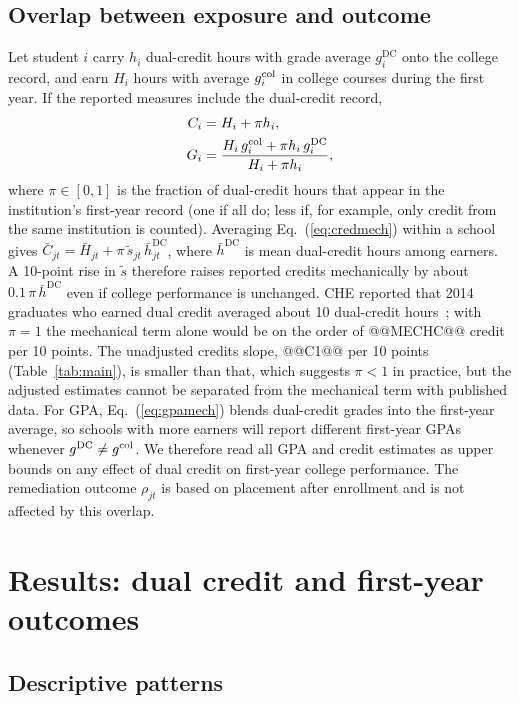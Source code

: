 \documentclass[aps,prd,reprint,superscriptaddress,nofootinbib,floatfix]{revtex4-2}
\newcommand{\DC}{\mathrm{DC}}
\begin{document}
\subsection{Overlap between exposure and outcome}\label{sec:overlap}

Let student $i$ carry $h_i$ dual-credit hours with grade average $g^{\DC}_i$ onto the college record, and earn $H_i$ hours with average $g^{\rm col}_i$ in college courses during the first year. If the reported measures include the dual-credit record,
\begin{align}
C_i&=H_i+\pi h_i,\label{eq:credmech}\\
G_i&=\frac{H_i\,g^{\rm col}_i+\pi h_i\,g^{\DC}_i}{H_i+\pi h_i},\label{eq:gpamech}
\end{align}
where $\pi\in[0,1]$ is the fraction of dual-credit hours that appear in the institution's first-year record (one if all do; less if, for example, only credit from the same institution is counted). Averaging Eq.~(\ref{eq:credmech}) within a school gives $\bar C_{jt}=\bar H_{jt}+\pi\,\tilde s_{jt}\,\bar h^{\DC}_{jt}$, where $\bar h^{\DC}$ is mean dual-credit hours among earners. A 10-point rise in $\tilde s$ therefore raises reported credits mechanically by about $0.1\,\pi\,\bar h^{\DC}$ even if college performance is unchanged. CHE reported that 2014 graduates who earned dual credit averaged about 10 dual-credit hours~\cite{che2016}; with $\pi=1$ the mechanical term alone would be on the order of @@MECHC@@ credit per 10 points. The unadjusted credits slope, @@C1@@ per 10 points (Table~\ref{tab:main}), is smaller than that, which suggests $\pi<1$ in practice, but the adjusted estimates cannot be separated from the mechanical term with published data. For GPA, Eq.~(\ref{eq:gpamech}) blends dual-credit grades into the first-year average, so schools with more earners will report different first-year GPAs whenever $g^{\DC}\neq g^{\rm col}$. We therefore read all GPA and credit estimates as upper bounds on any effect of dual credit on first-year college performance. The remediation outcome $\rho_{jt}$ is based on placement after enrollment and is not affected by this overlap.

\section{Results: dual credit and first-year outcomes}\label{sec:results}

\subsection{Descriptive patterns}
\end{document}
